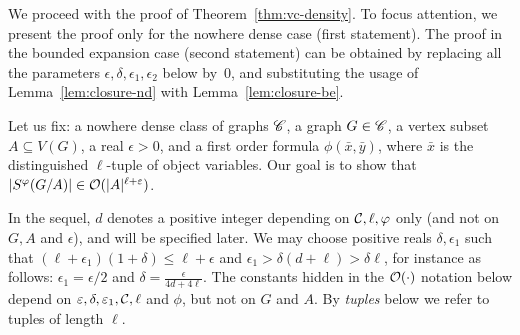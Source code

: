 We proceed with the proof of Theorem~\ref{thm:vc-density}.  To focus
attention, we present the proof only for the nowhere dense case (first
statement). The proof in the bounded expansion case (second statement)
can be obtained by replacing all the parameters
$\epsilon,\delta,\epsilon_1,\epsilon_2$ below by~$0$, and substituting
the usage of Lemma~\ref{lem:closure-nd} with
Lemma~\ref{lem:closure-be}.

Let us fix: a nowhere dense class of graphs $\CCC$, a graph
$G\in \CCC$, a vertex subset $A\subseteq V(G)$, a real $\epsilon>0$,
and a first order formula $\phi(\bar x,\bar y)$, where $\bar x$ is the
distinguished $\ell$-tuple of object variables.  Our goal is to show
that $|S^\phi(G/A)|\in \Oof(|A|^{\ell+\epsilon})$.
 	   
In the sequel, $d$ denotes a positive integer depending on
${\cal C},\ell,\phi$ only (and not on $G, A$ and $\epsilon$), and will
be specified later. We may choose positive reals $\delta,\epsilon_1$
such that $(\ell+\epsilon_1)(1+\delta) \le \ell+\epsilon$ and
$\epsilon_1>\delta(d+\ell)> \delta\ell$, for instance as follows:
$\epsilon_1=\epsilon/2$ and $\delta=\frac{\epsilon}{4d+4\ell}$.  The
constants hidden in the $\Oof(\cdot)$ notation below depend on
$\epsilon,\delta,\epsilon_1,\cal C, \ell$ and $\phi$, but not on $G$
and $A$.  By \emph{tuples} below we refer to tuples of length $\ell$.

